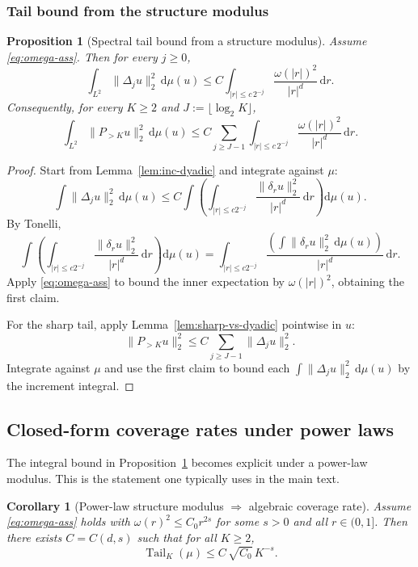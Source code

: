 \documentclass{article}
\numberwithin{equation}{section}
\theoremstyle{plain}
\newtheorem{proposition}[theorem]{Proposition}
\newtheorem{corollary}[theorem]{Corollary}
\theoremstyle{definition}
\theoremstyle{remark}
\newcommand{\Tail}{\operatorname{Tail}}
\begin{document}
\subsubsection{Tail bound from the structure modulus}

\begin{proposition}[Spectral tail bound from a structure modulus]
\label{prop:tail-omega}
Assume \eqref{eq:omega-ass}. Then for every $j\ge 0$,
\[
\int_{L^2}\|\Delta_j u\|_2^2\,\mathrm{d}\mu(u)
\le
C\int_{|r|\le c\,2^{-j}}\frac{\omega(|r|)^2}{|r|^d}\,\mathrm{d}r.
\]
Consequently, for every $K\ge 2$ and $J:=\lfloor\log_2 K\rfloor$,
\[
\int_{L^2}\|P_{>K}u\|_2^2\,\mathrm{d}\mu(u)
\le
C\sum_{j\ge J-1}\int_{|r|\le c\,2^{-j}}\frac{\omega(|r|)^2}{|r|^d}\,\mathrm{d}r.
\]
\end{proposition}

\begin{proof}
Start from Lemma~\ref{lem:inc-dyadic} and integrate against $\mu$:
\[
\int\|\Delta_j u\|_2^2\,\mathrm{d}\mu(u)
\le
C\int\left(\int_{|r|\le c2^{-j}}\frac{\|\delta_r u\|_2^2}{|r|^d}\,\mathrm{d}r\right)\mathrm{d}\mu(u).
\]
By Tonelli,
\[
\int\left(\int_{|r|\le c2^{-j}}\frac{\|\delta_r u\|_2^2}{|r|^d}\,\mathrm{d}r\right)\mathrm{d}\mu(u)
=
\int_{|r|\le c2^{-j}}\frac{\left(\int\|\delta_r u\|_2^2\,\mathrm{d}\mu(u)\right)}{|r|^d}\,\mathrm{d}r.
\]
Apply \eqref{eq:omega-ass} to bound the inner expectation by $\omega(|r|)^2$, obtaining the first claim.

For the sharp tail, apply Lemma~\ref{lem:sharp-vs-dyadic} pointwise in $u$:
\[
\|P_{>K}u\|_2^2 \le C\sum_{j\ge J-1}\|\Delta_j u\|_2^2.
\]
Integrate against $\mu$ and use the first claim to bound each
$\int\|\Delta_j u\|_2^2\,\mathrm{d}\mu(u)$ by the increment integral.
\end{proof}



\subsection{Closed-form coverage rates under power laws}

The integral bound in Proposition~\ref{prop:tail-omega} becomes explicit under a power-law modulus.
This is the statement one typically uses in the main text.


\begin{corollary}[Power-law structure modulus $\Rightarrow$ algebraic coverage rate]
\label{cor:powerlaw-coverage}
Assume \eqref{eq:omega-ass} holds with $\omega(r)^2\le C_0 r^{2s}$ for some $s>0$ and all $r\in(0,1]$.
Then there exists $C=C(d,s)$ such that for all $K\ge 2$,
\[
\Tail_K(\mu)\le C\,\sqrt{C_0}\,K^{-s}.
\]
\end{corollary}
\end{document}
